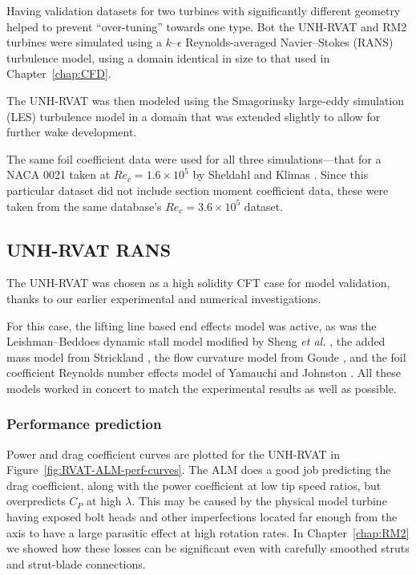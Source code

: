 
Having validation datasets for two turbines with significantly different
geometry helped to prevent ``over-tuning'' towards one type. Bot the UNH-RVAT
and RM2 turbines were simulated using a $k$--$\epsilon$ Reynolds-averaged
Navier--Stokes (RANS) turbulence model, using a domain identical in size to that
used in Chapter~\ref{chap:CFD}.


The UNH-RVAT was then modeled using the Smagorinsky large-eddy simulation (LES)
turbulence model \cite{Smagorinsky1963} in a domain that was extended slightly
to allow for further wake development.

The same foil coefficient data were used for all three simulations---that for a
NACA 0021 taken at $Re_c = 1.6 \times 10^5$ by Sheldahl and Klimas
\cite{Sheldahl1981}. Since this particular dataset did not include section
moment coefficient data, these were taken from the same database's $Re_c = 3.6
\times 10^5$ dataset.


\subsection{UNH-RVAT RANS}

The UNH-RVAT was chosen as a high solidity CFT case for model validation, thanks
to our earlier experimental and numerical investigations.

For this case, the lifting line based end effects model was active, as was the
Leishman--Beddoes dynamic stall model modified by Sheng \emph{et al.}
\cite{Sheng2008}, the added mass model from Strickland \cite{Strickland1981},
the flow curvature model from Goude \cite{Goude2012}, and the foil coefficient
Reynolds number effects model of Yamauchi and Johnston \cite{Yamauchi1983}. All
these models worked in concert to match the experimental results as well as
possible.


\subsubsection{Performance prediction}

Power and drag coefficient curves are plotted for the UNH-RVAT in
Figure~\ref{fig:RVAT-ALM-perf-curves}. The ALM does a good job predicting the
drag coefficient, along with the power coefficient at low tip speed ratios, but
overpredicts $C_P$ at high $\lambda$. This may be caused by the physical model
turbine having exposed bolt heads and other imperfections located far enough
from the axis to have a large parasitic effect at high rotation rates. In
Chapter~\ref{chap:RM2} we showed how these losses can be significant even with
carefully smoothed struts and strut-blade connections.

